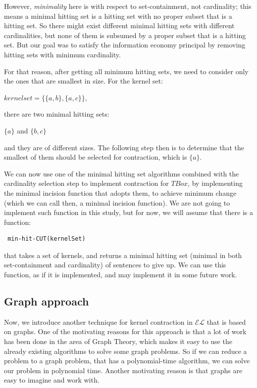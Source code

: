 However, \textit{minimality} here is with respect to set-containment, not cardinality; this means a minimal hitting set is a hitting set with no proper subset that is a hitting set. So there might exist different minimal hitting sets with different cardinalities, but none of them is subsumed by a proper subset that is a hitting set\cite{hit}. But our goal was to satisfy the information economy principal by removing hitting sets with minimum cardinality. 

For that reason, after getting all minimum hitting sets, we need to consider only the ones that are smallest in size. For the kernel set:
\begin{center}
$kernelset = \lbrace \lbrace a, b \rbrace , \lbrace a, c \rbrace \rbrace$,
\end{center}
there are two minimal hitting sets:
\begin{center}
$\lbrace a \rbrace$ \hspace{1cm} and \hspace{1cm} $\lbrace b, c \rbrace$
\end{center}
and they are of different sizes. The following step then is to determine that the smallest of them should be selected for contraction, which is $\lbrace a \rbrace$.

We can now use one of the minimal hitting set algorithms combined with the cardinality selection step to implement contraction for $TBox$, by implementing the minimal incision function that adopts them, to achieve minimum change (which we can call then, a minimal incision function). We are not going to implement such function in this study, but for now, we will assume that there is a function:
\begin{verbatim}
 min-hit-CUT(kernelSet)
\end{verbatim}
that takes a set of kernels, and returns a minimal hitting set (minimal in both set-containment and cardinality) of sentences to give up. We can use this function, as if it is implemented, and may implement it in some future work.

\subsection{Graph approach}
Now, we introduce another technique for kernel contraction in $\mathcal{EL}$ that is based on graphs. One of the motivating reasons for this approach is that a lot of work has been done in the area of Graph Theory, which makes it easy to use the already existing algorithms to solve some graph problems. So if we can reduce a problem to a graph problem, that has a polynomial-time algorithm, we can solve our problem in polynomial time. Another motivating reason is that graphs are easy to imagine and work with.

